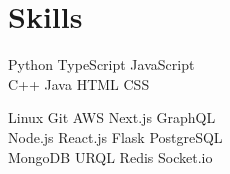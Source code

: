\documentclass[]{openfont}
\begin{document}
\begin{minipage}[t]{0.33\textwidth}

\section{Skills}

Python \textbullet{} TypeScript \textbullet{} JavaScript\\ \textbullet{} C++ \textbullet{} Java  \textbullet{} HTML \textbullet{} CSS

Linux \textbullet{} Git \textbullet{} AWS \textbullet{} Next.js
\textbullet{} GraphQL \textbullet{}\\ Node.js  \textbullet{} React.js
\textbullet{}  Flask \textbullet{} PostgreSQL\\ 
\textbullet{} MongoDB \textbullet{} URQL \textbullet{} Redis \textbullet{} Socket.io  \\


\sectionsep




\end{minipage} 
\end{document}
